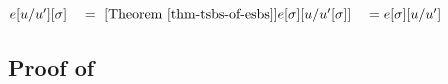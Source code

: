 \begin{links}
$\tsbsO{\esbsren{\expr}}
 \link{=}{\thmref{thm-tsbs-of-esbs}}
 \esbs{\tsbsO{\expr}}{\varI}{\tsbsO{\varI'}}
 \linK{=}
 \esbsren{\tsbsO{\expr}}$
\end{links}




\subsection*{Proof of }

